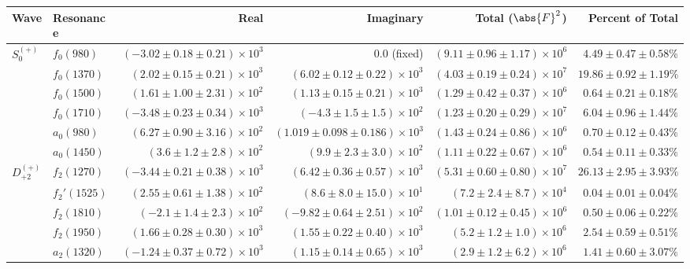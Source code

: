 \begin{table}[ht]
    \begin{center}
        \begin{tabular}{llrrrr}\toprule
        Wave & Resonance & Real & Imaginary & Total ($\abs{F}^2$) & Percent of Total \\\midrule
$S_{0}^{(+)}$ & $f_{0}(980)$ & $(-3.02 \pm 0.18 \pm 0.21) \times 10^{3}$ & $0.0$ (fixed) & $(9.11 \pm 0.96 \pm 1.17) \times 10^{6}$ & $4.49 \pm 0.47 \pm 0.58 \%$ \\
 & $f_{0}(1370)$ & $(2.02 \pm 0.15 \pm 0.21) \times 10^{3}$ & $(6.02 \pm 0.12 \pm 0.22) \times 10^{3}$ & $(4.03 \pm 0.19 \pm 0.24) \times 10^{7}$ & $19.86 \pm 0.92 \pm 1.19 \%$ \\
 & $f_{0}(1500)$ & $(1.61 \pm 1.00 \pm 2.31) \times 10^{2}$ & $(1.13 \pm 0.15 \pm 0.21) \times 10^{3}$ & $(1.29 \pm 0.42 \pm 0.37) \times 10^{6}$ & $0.64 \pm 0.21 \pm 0.18 \%$ \\
 & $f_{0}(1710)$ & $(-3.48 \pm 0.23 \pm 0.34) \times 10^{3}$ & $(-4.3 \pm 1.5 \pm 1.5) \times 10^{2}$ & $(1.23 \pm 0.20 \pm 0.29) \times 10^{7}$ & $6.04 \pm 0.96 \pm 1.44 \%$ \\
 & $a_{0}(980)$ & $(6.27 \pm 0.90 \pm 3.16) \times 10^{2}$ & $(1.019 \pm 0.098 \pm 0.186) \times 10^{3}$ & $(1.43 \pm 0.24 \pm 0.86) \times 10^{6}$ & $0.70 \pm 0.12 \pm 0.43 \%$ \\
 & $a_{0}(1450)$ & $(3.6 \pm 1.2 \pm 2.8) \times 10^{2}$ & $(9.9 \pm 2.3 \pm 3.0) \times 10^{2}$ & $(1.11 \pm 0.22 \pm 0.67) \times 10^{6}$ & $0.54 \pm 0.11 \pm 0.33 \%$ \\
$D_{+2}^{(+)}$ & $f_{2}(1270)$ & $(-3.44 \pm 0.21 \pm 0.38) \times 10^{3}$ & $(6.42 \pm 0.36 \pm 0.57) \times 10^{3}$ & $(5.31 \pm 0.60 \pm 0.80) \times 10^{7}$ & $26.13 \pm 2.95 \pm 3.93 \%$ \\
 & $f_{2}'(1525)$ & $(2.55 \pm 0.61 \pm 1.38) \times 10^{2}$ & $(8.6 \pm 8.0 \pm 15.0) \times 10^{1}$ & $(7.2 \pm 2.4 \pm 8.7) \times 10^{4}$ & $0.04 \pm 0.01 \pm 0.04 \%$ \\
 & $f_{2}(1810)$ & $(-2.1 \pm 1.4 \pm 2.3) \times 10^{2}$ & $(-9.82 \pm 0.64 \pm 2.51) \times 10^{2}$ & $(1.01 \pm 0.12 \pm 0.45) \times 10^{6}$ & $0.50 \pm 0.06 \pm 0.22 \%$ \\
 & $f_{2}(1950)$ & $(1.66 \pm 0.28 \pm 0.30) \times 10^{3}$ & $(1.55 \pm 0.22 \pm 0.40) \times 10^{3}$ & $(5.2 \pm 1.2 \pm 1.0) \times 10^{6}$ & $2.54 \pm 0.59 \pm 0.51 \%$ \\
 & $a_{2}(1320)$ & $(-1.24 \pm 0.37 \pm 0.72) \times 10^{3}$ & $(1.15 \pm 0.14 \pm 0.65) \times 10^{3}$ & $(2.9 \pm 1.2 \pm 6.2) \times 10^{6}$ & $1.41 \pm 0.60 \pm 3.07 \%$ \\

\end{tabular}
\end{center}
\end{table}
